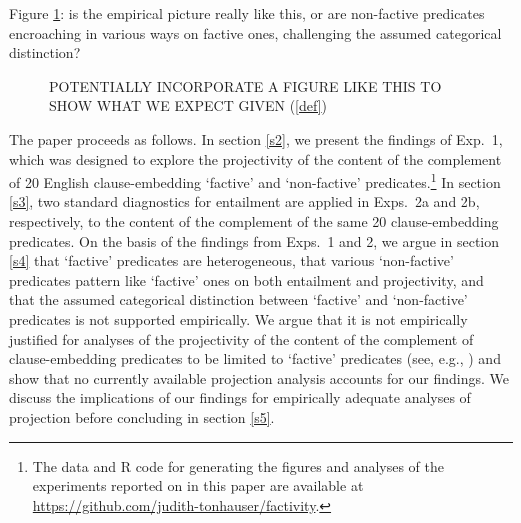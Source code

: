 \documentclass[11pt,fleqn]{article}
\newcommand{\6}{\mbox{$[\hspace*{-.6mm}[$}}
\newcommand{\9}{\mbox{$]\hspace*{-.6mm}]$}}
\begin{document}
Figure \ref{f-assumption}: is the empirical picture really like this, or are non-factive predicates encroaching in various ways on factive ones, challenging the assumed categorical distinction?

\begin{figure}[h]
\center


\caption{POTENTIALLY INCORPORATE A FIGURE LIKE THIS TO SHOW WHAT WE EXPECT GIVEN (\ref{def})}\label{f-assumption}
\end{figure}


The paper proceeds as follows. In section \ref{s2}, we present the findings of Exp.~1, which was designed to explore the projectivity of the content of the complement of 20 English clause-embedding `factive' and `non-factive' predicates.\footnote{\label{f-github}The
data and R code for generating the figures and analyses of the experiments reported on in this paper are available at \url{https://github.com/judith-tonhauser/factivity}.}  In section \ref{s3}, two standard diagnostics for entailment are applied in Exps.~2a and 2b, respectively, to the content of the complement of the same 20 clause-embedding predicates. On the basis of the findings from Exps.~1 and 2, we argue in section \ref{s4} that `factive' predicates are heterogeneous, that various `non-factive' predicates pattern like `factive' ones on both entailment and projectivity, and that the assumed categorical distinction between `factive' and `non-factive' predicates is not supported empirically. We argue that it is not empirically justified for analyses of the projectivity of the content of the complement of clause-embedding predicates to be limited to `factive' predicates (see, e.g., \citealt{heim83,vds92,abrusan2011,abrusan2016,romoli2015,best-question}) and show that no currently available projection analysis accounts for our findings. We discuss the implications of our findings for empirically adequate analyses of projection before concluding in section \ref{s5}.
\end{document}
